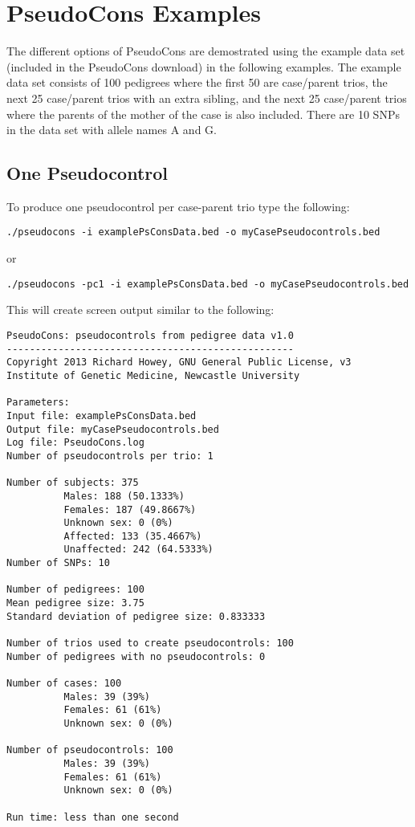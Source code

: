 \documentclass[a4paper,12pt]{article}
\begin{document}

\section{PseudoCons Examples}
\label{example}

The different options of PseudoCons are demostrated using the example data set (included in the PseudoCons download) in the following examples. The example data set consists of 100 pedigrees where the first 50 are case/parent trios, the next 25 case/parent trios with an extra sibling, and the next 25 case/parent trios where the parents of the mother of the case is also included. There are 10 SNPs in the data set with allele names A and G. 
\subsection{One Pseudocontrol}
\label{eg-pseudocons1}

To produce one pseudocontrol per case-parent trio type the following: 
\begin{verbatim}
./pseudocons -i examplePsConsData.bed -o myCasePseudocontrols.bed
\end{verbatim}

or 
\begin{verbatim}
./pseudocons -pc1 -i examplePsConsData.bed -o myCasePseudocontrols.bed
\end{verbatim}

This will create screen output similar to the following: 
\begin{verbatim}
PseudoCons: pseudocontrols from pedigree data v1.0
--------------------------------------------------
Copyright 2013 Richard Howey, GNU General Public License, v3
Institute of Genetic Medicine, Newcastle University

Parameters:
Input file: examplePsConsData.bed
Output file: myCasePseudocontrols.bed
Log file: PseudoCons.log
Number of pseudocontrols per trio: 1

Number of subjects: 375
          Males: 188 (50.1333%)
          Females: 187 (49.8667%)
          Unknown sex: 0 (0%)
          Affected: 133 (35.4667%)
          Unaffected: 242 (64.5333%)
Number of SNPs: 10

Number of pedigrees: 100
Mean pedigree size: 3.75
Standard deviation of pedigree size: 0.833333

Number of trios used to create pseudocontrols: 100
Number of pedigrees with no pseudocontrols: 0

Number of cases: 100
          Males: 39 (39%)
          Females: 61 (61%)
          Unknown sex: 0 (0%)

Number of pseudocontrols: 100
          Males: 39 (39%)
          Females: 61 (61%)
          Unknown sex: 0 (0%)

Run time: less than one second
\end{verbatim}
\end{document}
